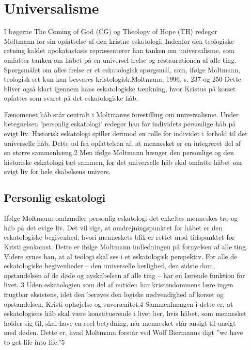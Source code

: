 \chapter{Universalisme}
I bøgerne The Coming of God (CG) og Theology of Hope (TH) redegør Moltmann for sin opfattelse af den kristne eskatologi. Indenfor den teologiske retning kaldet apokatastasis repræsenterer han tanken om universalisme, som omfatter tanken om håbet på en universel frelse og restaurationen af alle ting. Spørgsmålet om alles frelse er et eskatologisk spørgsmål, som, ifølge Moltmann, teologisk set kun kan besvares kristologisk.{Moltmann, 1996, s. 237 og 250} Dette bliver også klart igennem hans eskatologiske tænkning, hvor Kristus på korset opfattes som svaret på det eskatologiske håb.

Fænomenet håb står centralt i Moltmanns forestilling om universalisme. Under betegnelsen 'personlig eskatologi' redegør han for individets personlige håb på evigt liv. Historisk eskatologi spiller derimod en rolle for individet i forhold til det universelle håb. Dette ud fra opfattelsen af, at mennesket er en integreret del af en større sammenhæng.2 Men ifølge Moltmann hænger den personlige og den historiske eskatologi tæt sammen, for det universelle håb skal omfatte håbet om evigt liv for hele skabelsens univers.  

\section{Personlig eskatologi}
Ifølge Moltmann omhandler personlig eskatologi det enkeltes menneskes tro og håb på det evige liv. Det
vil sige, at omdrejningspunktet for håbet er den eskatologiske begivenhed, hvori menneskets blik er rettet mod tidspunktet for Kristi genkomst. Dette er ifølge Moltmann indledningen på fornyelsen af alle ting. Videre synes han, at al teologi skal ses i et eskatologisk perspektiv. For alle de eskatologiske begivenheder -- den universelle herlighed, den sidste dom, opstandelsen af de døde og nyskabelsen af alle ting -- har en lærende funktion for livet. 3 Uden eskatologien som del af nutiden har kristendommens lære ingen frugtbar eksistens, idet den berøves den logiske nødvendighed af korset og opstandelsen, Kristi ophøjelse og suverænitet.4 Sammenhængen i dette er, at eskatologiens håb skal være konstituerende i livet her, hvis håbet, som mennesket holder sig til, skal have en reel betydning, når mennesket står ansigt til ansigt med døden. Dette er, hvad Moltmann forstår ved Wolf Biermanns digt ”we have to get life into life.”5

